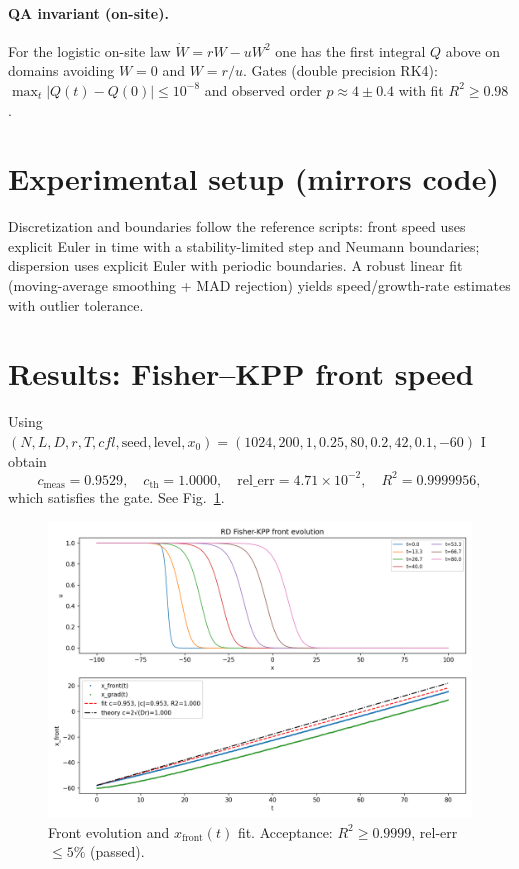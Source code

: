 \documentclass[11pt]{article}
\begin{document}
\paragraph{QA invariant (on-site).} For the logistic on-site law $\dot W = rW - uW^2$ one has the first integral $Q$ above on domains avoiding $W=0$ and $W=r/u$. Gates (double precision RK4): $\max_t|Q(t)-Q(0)| \le 10^{-8}$ and observed order $p\approx 4\pm 0.4$ with fit $R^2\ge 0.98$.

\section{Experimental setup (mirrors code)}
Discretization and boundaries follow the reference scripts: front speed uses explicit Euler in time with a stability-limited step and Neumann boundaries; dispersion uses explicit Euler with periodic boundaries. A robust linear fit (moving-average smoothing + MAD rejection) yields speed/growth-rate estimates with outlier tolerance.

\section{Results: Fisher--KPP front speed}
Using $(N,L,D,r,T,cfl,\text{seed},\text{level},x_0)=(1024,200,1,0.25,80,0.2,42,0.1,-60)$ I obtain
\[
c_{\mathrm{meas}}=0.9529,\quad c_{\mathrm{th}}=1.0000,\quad \mathrm{rel\_err}=4.71\times 10^{-2},\quad R^2=0.9999956,
\]
which satisfies the gate. See Fig.~\ref{fig:front}.

\begin{figure}[t]
\centering
\includegraphics[width=0.9\linewidth]{figs/rd_front_speed.png}
\caption{Front evolution and $x_{\mathrm{front}}(t)$ fit. Acceptance: $R^2 \ge 0.9999$, rel-err $\le 5\%$ (passed).}
\label{fig:front}
\end{figure}
\end{document}
